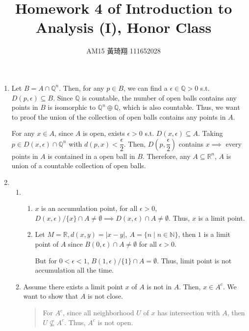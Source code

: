 \documentclass[12pt]{article}
\title{Homework 4 of Introduction to Analysis (I), Honor Class}
\author{AM15 黃琦翔 111652028}
\begin{document}
\maketitle
\begin{enumerate}
    \item Let $B = A \cap \mathbb{Q}^n$.
    Then, for any $p \in B$, we can find a $\epsilon\in \mathbb{Q} > 0$ s.t. $D(p, \epsilon) \subseteq B$.
    Since $\mathbb{Q}$ is countable, the number of open balls contains any points in $B$ is isomorphic to $\mathbb{Q}^n \oplus \mathbb{Q}$, which is also countable.
    Thus, we want to proof the union of the collection of open balls contains any points in $A$.

    For any $x \in A$, since $A$ is open, exists $\epsilon > 0$ s.t. $D(x, \epsilon) \subseteq A$. Taking $p \in D(x, \epsilon) \cap \mathbb{Q}^n$ with $d(p, x) < \dfrac{\epsilon}{2}$.
    Then, $D(p, \dfrac{\epsilon}{2})$ contains $x\implies$ every points in $A$ is contained in a open ball in $B$.
    Therefore, any $A \subseteq \mathbb{R}^n$, $A$ is union of a countable collection of open balls.

    \item\begin{enumerate}
        \item\begin{enumerate}
            \item $x$ is an accumulation point, for all $\epsilon > 0$, $D(x, \epsilon)/\lbrace x \rbrace \cap A \neq \emptyset\implies D(x, \epsilon) \cap A \neq \emptyset$.
            Thus, $x$ is a limit point.
            \item Let $M = \mathbb{R}, d(x, y) = |x-y|,\ A = \lbrace n \mid n \in \mathbb{N}\rbrace$, then $1$ is a limit point of $A$ since $B(0, \epsilon) \cap A \neq \emptyset$ for all $\epsilon > 0$.
            
            But for $0 < \epsilon < 1$, $B(1, \epsilon)/\lbrace 1 \rbrace \cap A = \emptyset$. Thus, limit point is not accumulation all the time.
        \end{enumerate}
        \item Assume there exists a limit point $x$ of $A$ is not in $A$.
        Then, $x \in A^c$. We want to show that $A$ is not close.
        \begin{quote}
            For $A^c$, since all neighborhood $U$ of $x$ has intersection with $A$, then $U \nsubseteq A^c$. 
            Thus, $A^c$ is not open.
        \end{quote}


\end{enumerate}
\end{enumerate}
\end{document}
